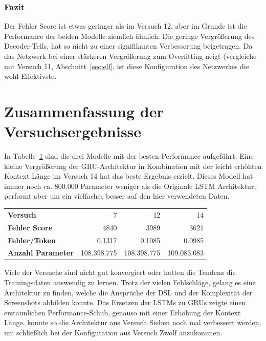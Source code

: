 \documentclass[pdftex,a4paper,halfparskip, article]{scrartcl}
\begin{document}
\subsubsection*{Fazit}

Der Fehler Score ist etwas geringer als im Versuch 12, aber im Grunde ist die Performance der beiden Modelle ziemlich ähnlich. Die geringe Vergrößerung des Decoder-Teils, hat so nicht zu einer signifikanten Verbesserung beigetragen. Da das Netzwerk bei einer stärkeren Vergrößerung zum Overfitting neigt (vergleiche mit Versuch 11, Abschnitt~\ref{sec:elf}, ist diese Konfiguration des Netzwerkes die wohl Effektivste.

\section{Zusammenfassung der Versuchsergebnisse}

In Tabelle~\ref{tab:comparison} sind die drei Modelle mit der besten Performance aufgeführt. Eine kleine Vergrößerung der GRU-Architektur in Kombination mit der leicht erhöhten Kontext Länge im Versuch 14 hat das beste Ergebnis erzielt. Dieses Modell hat immer noch ca. 800.000 Parameter weniger als die Originale LSTM Architektur, performt aber um ein vielfaches besser auf den hier verwendeten Daten.

\begin{table}[]
\begin{tabular}{lrrr}
\textbf{Versuch}& 7      & 12       & 14    \\
\textbf{Fehler Score    }                     & 4840        & 3989        & 3621        \\
\textbf{Fehler/Token}                       & 0.1317      & 0.1085      & 0.0985      \\
\textbf{Anzahl Parameter} & 108.398.775 & 108.398.775 & 109.083.083
\end{tabular}

\label{tab:comparison}
\end{table}

Viele der Versuche sind nicht gut konvergiert oder hatten die Tendenz die Trainingsdaten auswendig zu lernen. Trotz der vielen Fehlschläge, gelang es eine Architektur zu finden, welche die Ansprüche der DSL und der Komplexität der Screenshots abbilden konnte. 
Das Ersetzen der LSTMs zu GRUs zeigte einen erstaunlichen Performance-Schub, genauso mit einer Erhöhung der Kontext Länge, konnte so die Architektur aus Versuch Sieben noch mal verbessert werden, um schließlich bei der Konfiguration aus Versuch Zwölf anzukommen. 
\end{document}
